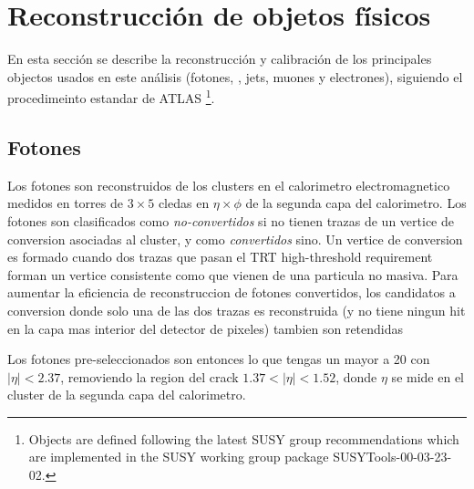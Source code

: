 \chapter{Reconstrucción de objetos físicos} %
\label{sec:obj_selection}


En esta secci\'on se describe la reconstrucci\'on y calibraci\'on de los
principales objectos usados en este an\'alisis
(fotones, \met, jets, muones y electrones), siguiendo el procedimeinto
estandar de ATLAS \footnote{Objects are defined following the latest SUSY
  group recommendations which are implemented in the SUSY working group
  package SUSYTools-00-03-23-02.}.


\section{Fotones}
\label{sec:obj_photons}

Los fotones son reconstruidos de los clusters en el calorimetro electromagnetico
medidos en torres de $3\times5$ cledas en $\eta\times\phi$ de la segunda capa del
calorimetro.
Los fotones son clasificados como \emph{no-convertidos} si no tienen trazas de un vertice
de conversion asociadas al cluster, y como \emph{convertidos} sino.
Un vertice de conversion es formado cuando dos trazas que pasan el TRT high-threshold requirement
forman un vertice consistente como que vienen de una particula no masiva.
Para aumentar la eficiencia de reconstruccion de fotones convertidos, los candidatos a conversion
donde solo una de las dos trazas es reconstruida (y no tiene ningun hit en la capa mas interior
del detector de pixeles) tambien son retendidas

Los fotones pre-seleccionados son entonces lo que tengas un {\pt} mayor a
20 {\gev} con $|\eta| < 2.37$, removiendo la region del crack $1.37 < |\eta| < 1.52$,
donde $\eta$ se mide en el cluster de la segunda capa del calorimetro.

